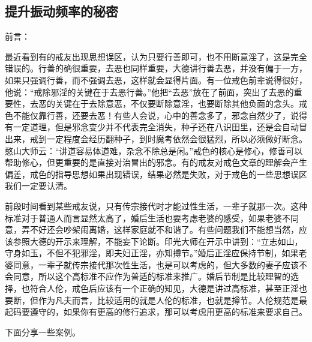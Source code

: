 \subsection{提升振动频率的秘密}

前言：

最近看到有的戒友出现思想误区，认为只要行善即可，也不用断意淫了，这是完全错误的。行善的确很重要，去恶也同样重要，大德讲行善去恶，并没有偏于一方，如果只强调行善，而不强调去恶，这样就会显得片面。有一位戒色前辈说得很好，他说：“戒除邪淫的关键在于去恶行善。”他把“去恶”放在了前面，突出了去恶的重要性，去恶的关键在于去除意恶，不仅要断除意淫，也要断除其他负面的念头。戒色不能仅靠行善，还要去恶！有些人会说，心中的善念多了，邪念自然少了，说得有一定道理，但是邪念变少并不代表完全消失，种子还在八识田里，还是会自动冒出来，戒到一定程度会经历翻种子，到时魔考依然会很猛烈，所以必须做好断念。憨山大师云：“讲道容易体道难，杂念不除总是闲。”戒色的核心是修心，修善可以帮助修心，但更重要的是直接对治冒出的邪念。有的戒友对戒色文章的理解会产生偏差，戒色的指导思想如果出现错误，结果必然是失败，对于戒色的一些思想误区我们一定要认清。

前段时间看到某些戒友说，只有传宗接代时才能过性生活，一辈子就那一次。这种标准对于普通人而言显然太高了，婚后生活也要考虑老婆的感受，如果老婆不同意，弄不好还会吵架闹离婚，这样家庭就不和谐了。有些问题我们不能想当然，应该参照大德的开示来理解，不能妄下论断。印光大师在开示中讲到：“立志如山，守身如玉，不但不犯邪淫，即夫妇正淫，亦知撙节。”婚后正淫应保持节制，如果老婆同意，一辈子就传宗接代那次性生活，也是可以考虑的，但大多数的妻子应该不会同意，所以这个高标准不应作为普适的标准来推广。婚后节制是比较理智的选择，也符合人伦，戒色后应该有一个正确的知见，大德是讲过高标准，甚至正淫也要断，但作为凡夫而言，比较适用的就是人伦的标准，也就是撙节。人伦规范是最起码要遵守的，如果你有更高的修行追求，那可以考虑用更高的标准来要求自己。

下面分享一些案例。

